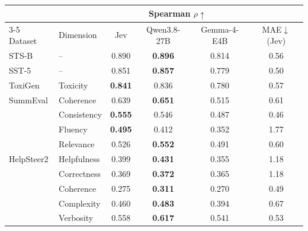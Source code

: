 \begin{tabular}{l l c c c c}
    \toprule
    & & \multicolumn{3}{c}{Spearman $\rho\uparrow$} & \\
    \cmidrule(lr){3-5}
    Dataset & Dimension & Jev & Qwen3.8-27B & Gemma-4-E4B & MAE$\downarrow$ (Jev) \\
    \midrule
    STS-B & -- & 0.890 & \textbf{0.896} & 0.814 & 0.56 \\
    \rowcolor{gray!10}SST-5 & -- & 0.851 & \textbf{0.857} & 0.779 & 0.50 \\
    ToxiGen & Toxicity & \textbf{0.841} & 0.836 & 0.780 & 0.57 \\
    \rowcolor{gray!10}SummEval & Coherence & 0.639 & \textbf{0.651} & 0.515 & 0.61 \\
    \rowcolor{gray!10} & Consistency & \textbf{0.555} & 0.546 & 0.487 & 0.46 \\
    \rowcolor{gray!10} & Fluency & \textbf{0.495} & 0.412 & 0.352 & 1.77 \\
    \rowcolor{gray!10} & Relevance & 0.526 & \textbf{0.552} & 0.491 & 0.60 \\
    HelpSteer2 & Helpfulness & 0.399 & \textbf{0.431} & 0.355 & 1.18 \\
     & Correctness & 0.369 & \textbf{0.372} & 0.365 & 1.18 \\
     & Coherence & 0.275 & \textbf{0.311} & 0.270 & 0.49 \\
     & Complexity & 0.460 & \textbf{0.483} & 0.394 & 0.67 \\
     & Verbosity & 0.558 & \textbf{0.617} & 0.541 & 0.53 \\
    \bottomrule
\end{tabular}
